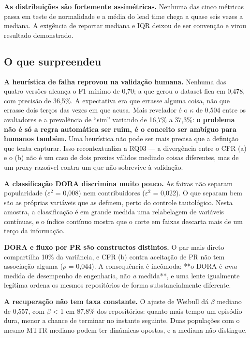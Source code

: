 \documentclass[12pt]{article}
\begin{document}
\textbf{As distribuições são fortemente assimétricas.} Nenhuma das cinco métricas passa em teste de normalidade e a média do lead time chega a quase seis vezes a mediana. A exigência de reportar mediana e IQR deixou de ser convenção e virou resultado demonstrado.

\subsection{O que surpreendeu}

\textbf{A heurística de falha reprovou na validação humana.} Nenhuma das quatro versões alcança o F1 mínimo de 0,70; a que gerou o dataset fica em 0,478, com precisão de 36,5\%. A expectativa era que errasse alguma coisa, não que errasse dois terços das vezes em que acusa. Mais revelador é o $\kappa$ de 0,504 entre os avaliadores e a prevalência de ``sim'' variando de 16,7\% a 37,3\%: \textbf{o problema não é só a regra automática ser ruim, é o conceito ser ambíguo para humanos também.} Uma heurística não pode ser mais precisa que a definição que tenta capturar. Isso recontextualiza a RQ03 — a divergência entre o CFR (a) e o (b) não é um caso de dois proxies válidos medindo coisas diferentes, mas de um proxy razoável contra um que não sobrevive à validação.

\textbf{A classificação DORA discrimina muito pouco.} As faixas não separam popularidade ($\varepsilon$$^2$ = 0,008) nem contribuidores ($\varepsilon$$^2$ = 0,022). O que separam bem são as próprias variáveis que as definem, perto do controle tautológico. Nesta amostra, a classificação é em grande medida uma relabelagem de variáveis contínuas, e o índice contínuo mostra que o corte em faixas descarta mais de um terço da informação.

\textbf{DORA e fluxo por PR são constructos distintos.} O par mais direto compartilha 10\% da variância, e CFR (b) contra aceitação de PR não tem associação alguma ($\rho$ = 0,044). A consequência é incômoda: **o DORA é \emph{uma} medida de desempenho de engenharia, não \emph{a} medida**, e uma lente igualmente legítima ordena os mesmos repositórios de forma substancialmente diferente.

\textbf{A recuperação não tem taxa constante.} O ajuste de Weibull dá $\beta$ mediano de 0,557, com $\beta$ < 1 em 87,8\% dos repositórios: quanto mais tempo um episódio dura, menor a chance de terminar no instante seguinte. Duas populações com o mesmo MTTR mediano podem ter dinâmicas opostas, e a mediana não distingue.
\end{document}
